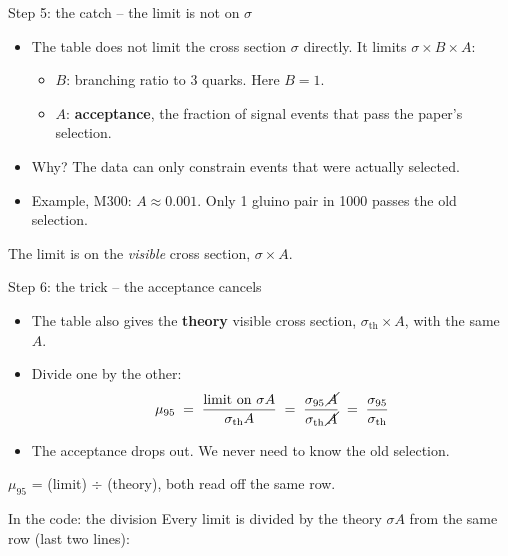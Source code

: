 \documentclass[aspectratio=169,12pt]{beamer}
\newcommand{\codesource}[1]{\par\vspace{0.2em}{\tiny\color{softgray} from #1}\par}
\newcommand{\takeaway}[1]{\vfill
  \colorbox{boxbg}{\parbox{0.96\textwidth}{\centering\vspace{0.3em}#1\vspace{0.3em}}}
  \par\vspace{0.6em}}
\begin{document}
\begin{frame}{Step 5: the catch -- the limit is not on $\sigma$}
  \begin{itemize}
    \item The table does not limit the cross section $\sigma$ directly.
          It limits $\sigma \times B \times A$:
      \begin{itemize}
        \item $B$: branching ratio to 3 quarks. Here $B = 1$.
        \item $A$: \textbf{acceptance}, the fraction of signal events that pass
              the paper's selection.
      \end{itemize}
    \item Why? The data can only constrain events that were actually selected.
    \item Example, M300: $A \approx 0.001$. Only 1 gluino pair in 1000 passes the
          old selection.
  \end{itemize}
  \takeaway{The limit is on the \emph{visible} cross section, $\sigma \times A$.}
\end{frame}

\begin{frame}{Step 6: the trick -- the acceptance cancels}
  \begin{itemize}
    \item The table also gives the \textbf{theory} visible cross section,
          $\sigma_{\text{th}} \times A$, with the same $A$.
    \item Divide one by the other:
          \[ \mu_{95} \;=\; \frac{\text{limit on } \sigma A}{\sigma_{\text{th}} A}
             \;=\; \frac{\sigma_{95} \, \cancel{A}}{\sigma_{\text{th}}\, \cancel{A}}
             \;=\; \frac{\sigma_{95}}{\sigma_{\text{th}}} \]
    \item The acceptance drops out. We never need to know the old selection.
  \end{itemize}
  \takeaway{$\mu_{95}$ = (limit) $\div$ (theory), both read off the same row.}
\end{frame}

\begin{frame}{In the code: the division}
  Every limit is divided by the theory $\sigma A$ from the same row
  (last two lines):
  \vspace{0.3em}
  {\lstset{basicstyle=\ttfamily\tiny}\sniplimitdiv}
  \codesource{\srclimitdiv}
\end{frame}
\end{document}
